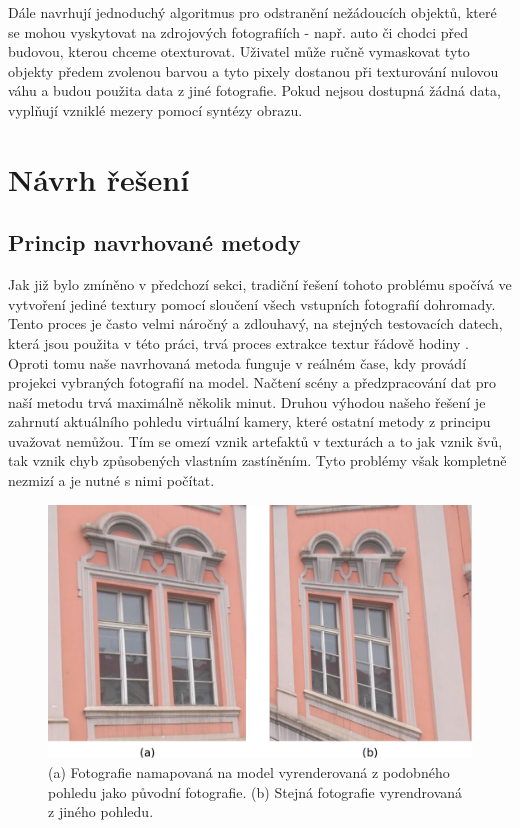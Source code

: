 \documentclass[11pt,twoside,a4paper]{book}
\begin{document}
Dále navrhují jednoduchý algoritmus pro odstranění nežádoucích objektů, které se mohou vyskytovat na zdrojových fotografiích - např. auto či chodci před budovou, kterou chceme otexturovat. Uživatel může ručně vymaskovat tyto objekty předem zvolenou barvou a tyto pixely dostanou při texturování nulovou váhu a budou použita data z jiné fotografie. Pokud nejsou dostupná žádná data, vyplňují vzniklé mezery pomocí syntézy obrazu.

\section{Návrh řešení}

\subsection{Princip navrhované metody}

Jak již bylo zmíněno v předchozí sekci, tradiční řešení tohoto problému spočívá ve vytvoření jediné textury pomocí sloučení všech vstupních fotografií dohromady. Tento proces je často velmi náročný a zdlouhavý, na stejných testovacích datech, která jsou použita v této práci, trvá proces extrakce textur řádově hodiny \cite{Kirschner08}. Oproti tomu naše navrhovaná metoda funguje v reálném čase, kdy provádí projekci vybraných fotografií na model. Načtení scény a předzpracování dat pro naší metodu trvá maximálně několik minut. Druhou výhodou našeho řešení je zahrnutí aktuálního pohledu virtuální kamery, které ostatní metody z principu uvažovat nemůžou. Tím se omezí vznik artefaktů v texturách a to jak vznik švů, tak vznik chyb způsobených vlastním zastíněním. Tyto problémy však kompletně nezmizí a je nutné s nimi počítat. 

\begin{figure}[t]
\begin{center}
\includegraphics[width=\textwidth]{figures/faust}
\caption{(a) Fotografie namapovaná na model vyrenderovaná z podobného pohledu jako původní fotografie. (b) Stejná fotografie vyrendrovaná z jiného pohledu.}
\label{fig:faust}
\end{center}
\end{figure}
\end{document}
